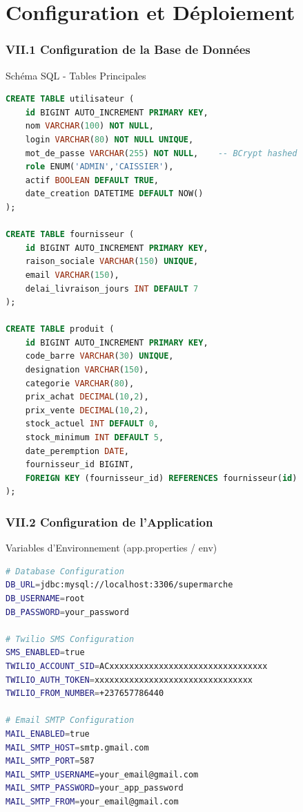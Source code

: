 \documentclass[11pt, aspectratio=169]{beamer}
\begin{document}
\section{Configuration et Déploiement}

\begin{frame}
    \frametitle{VII.1 Configuration de la Base de Données}
    
    \begin{block}{Schéma SQL - Tables Principales}
        \begin{lstlisting}[language=SQL, basicstyle=\ttfamily\tiny]
CREATE TABLE utilisateur (
    id BIGINT AUTO_INCREMENT PRIMARY KEY,
    nom VARCHAR(100) NOT NULL,
    login VARCHAR(80) NOT NULL UNIQUE,
    mot_de_passe VARCHAR(255) NOT NULL,    -- BCrypt hashed
    role ENUM('ADMIN','CAISSIER'),
    actif BOOLEAN DEFAULT TRUE,
    date_creation DATETIME DEFAULT NOW()
);

CREATE TABLE fournisseur (
    id BIGINT AUTO_INCREMENT PRIMARY KEY,
    raison_sociale VARCHAR(150) UNIQUE,
    email VARCHAR(150),
    delai_livraison_jours INT DEFAULT 7
);

CREATE TABLE produit (
    id BIGINT AUTO_INCREMENT PRIMARY KEY,
    code_barre VARCHAR(30) UNIQUE,
    designation VARCHAR(150),
    categorie VARCHAR(80),
    prix_achat DECIMAL(10,2),
    prix_vente DECIMAL(10,2),
    stock_actuel INT DEFAULT 0,
    stock_minimum INT DEFAULT 5,
    date_peremption DATE,
    fournisseur_id BIGINT,
    FOREIGN KEY (fournisseur_id) REFERENCES fournisseur(id)
);
        \end{lstlisting}
    \end{block}
\end{frame}

\begin{frame}
    \frametitle{VII.2 Configuration de l'Application}
    
    \begin{block}{Variables d'Environnement (app.properties / env)}
        \begin{lstlisting}[language=bash, basicstyle=\ttfamily\small]
# Database Configuration
DB_URL=jdbc:mysql://localhost:3306/supermarche
DB_USERNAME=root
DB_PASSWORD=your_password

# Twilio SMS Configuration
SMS_ENABLED=true
TWILIO_ACCOUNT_SID=ACxxxxxxxxxxxxxxxxxxxxxxxxxxxxxxxx
TWILIO_AUTH_TOKEN=xxxxxxxxxxxxxxxxxxxxxxxxxxxxxxxx
TWILIO_FROM_NUMBER=+237657786440

# Email SMTP Configuration
MAIL_ENABLED=true
MAIL_SMTP_HOST=smtp.gmail.com
MAIL_SMTP_PORT=587
MAIL_SMTP_USERNAME=your_email@gmail.com
MAIL_SMTP_PASSWORD=your_app_password
MAIL_SMTP_FROM=your_email@gmail.com
        \end{lstlisting}
    \end{block}
\end{frame}
\end{document}
